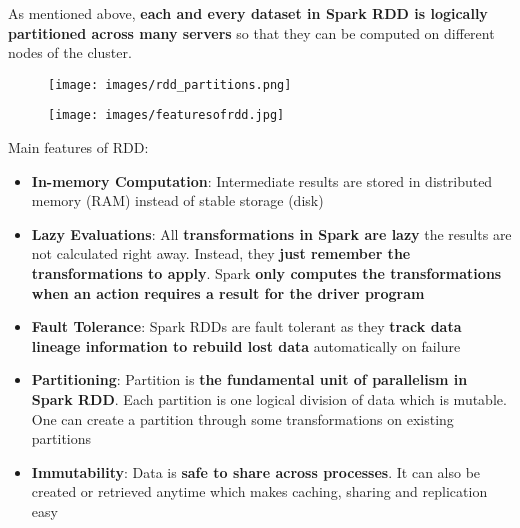 \documentclass{beamer}[10pt, usepdftitle=false handout]
\begin{document}
\begin{frame}

As mentioned above, \textbf{each and every dataset in Spark RDD is logically partitioned across many servers} so that they can be computed on different nodes of the cluster. 
\vspace*{0.6em}

\begin{figure}
	\texttt{[image: images/rdd\_partitions.png]} 
\end{figure}	
	
\end{frame}

\begin{frame}

\begin{figure}
	\texttt{[image: images/featuresofrdd.jpg]} 
\end{figure}	
	
\end{frame}

\begin{frame}
Main features of RDD:
\vspace*{0.6em}

\begin{itemize}
\item{\textbf{In-memory Computation}: Intermediate results are stored in distributed memory (RAM) instead of stable storage (disk)}
\item{\textbf{Lazy Evaluations}: All \textbf{transformations in Spark are lazy} the results are not calculated right away. Instead, they \textbf{just remember the transformations to apply}. Spark \textbf{only computes the transformations when an action requires a result for the driver program}}
\item{\textbf{Fault Tolerance}: Spark RDDs are fault tolerant as they \textbf{track data lineage information to rebuild lost data} automatically on failure}
\item{\textbf{Partitioning}: Partition is \textbf{the fundamental unit of parallelism in Spark RDD}. Each partition is one logical division of data which is mutable. One can create a partition through some transformations on existing partitions}
\item{\textbf{Immutability}: Data is \textbf{safe to share across processes}. It can also be created or retrieved anytime which makes caching, sharing and replication easy}
\end{itemize}

\end{frame}
\end{document}
